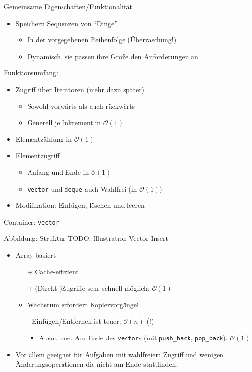 \begin{frame}[fragile]{Gemeinsame Eigenschaften/Funktionalität}
	\begin{itemize}
		\item Speichern Sequenzen von \enquote{Dinge}
		\begin{itemize}
			\item In der vorgegebenen Reihenfolge (Überraschung!)
			\pause
			\item Dynamisch, sie passen ihre Größe den Anforderungen an
		\end{itemize}
	\end{itemize}
	
	\pause
	
	Funktionsumfang:
	\begin{itemize}
		\item Zugriff über Iteratoren (mehr dazu später)
		\begin{itemize}
			\item Sowohl vorwärts als auch rückwärts
			\item Generell je Inkrement in $\mathcal{O}(1)$
		\end{itemize}
		\pause
		\item Elementzählung in $\mathcal{O}(1)$
		\pause
		\item Elementzugriff
		\begin{itemize}
			\item Anfang und Ende in $\mathcal{O}(1)$
			\item \verb|vector| und \verb|deque| auch Wahlfrei (in $\mathcal{O}(1)$)
		\end{itemize}
		\pause
		\item Modifikation: Einfügen, löschen und leeren
	\end{itemize}
\end{frame}

\begin{frame}[fragile]{Container: \texttt{vector}}
	\begin{block}{Abbildung: Struktur}
		TODO: Illustration Vector-Insert
	\end{block}

	\begin{itemize}
		\item Array-basiert
		\pause
		\begin{itemize}
			\item[+] Cache-effizient
			\item[+] (Direkt-)Zugriffe sehr schnell möglich: $\mathcal{O}(1)$
			\pause
			\item Wachstum erfordert Kopiervorgänge!
			\item[-] Einfügen/Entfernen ist teuer: $\mathcal{O}(n)$ (!)
			\begin{itemize}
				\item Ausnahme: Am Ende des \verb|vector|s (mit \verb|push_back|, \verb|pop_back|): $\mathcal{O}(1)$
			\end{itemize}
		\end{itemize}
		\pause
		\item Vor allem geeignet für Aufgaben mit wahlfreiem Zugriff und wenigen Änderungsoperationen die nicht am Ende stattfinden.
	\end{itemize}
\end{frame}
	
